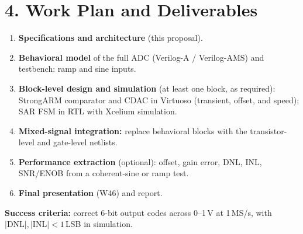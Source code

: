 \documentclass[10pt,a4paper]{article}
\begin{document}
\section{4. Work Plan and Deliverables}
\begin{enumerate}
  \item \textbf{Specifications and architecture} (this proposal).
  \item \textbf{Behavioral model} of the full ADC (Verilog-A / Verilog-AMS) and testbench: ramp and sine inputs.
  \item \textbf{Block-level design and simulation} (at least one block, as required): StrongARM comparator and CDAC
        in Virtuoso (transient, offset, and speed); SAR FSM in RTL with Xcelium simulation.
  \item \textbf{Mixed-signal integration:} replace behavioral blocks with the transistor-level and gate-level netlists.
  \item \textbf{Performance extraction} (optional): offset, gain error, DNL, INL, SNR/ENOB from a coherent-sine or ramp test.
  \item \textbf{Final presentation} (W46) and report.
\end{enumerate}

\textbf{Success criteria:} correct 6-bit output codes across 0--1\,V at 1\,MS/s, with $|\mathrm{DNL}|,|\mathrm{INL}| < 1$\,LSB in
simulation.
\end{document}
